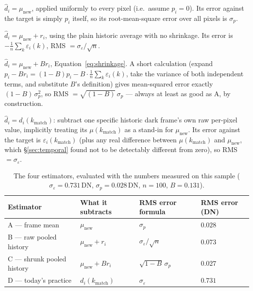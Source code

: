 \documentclass[11pt,a4paper]{article}
\begin{document}
\begin{description}[leftmargin=2.7cm,style=nextline]
\item[A --- frame mean only] $\hat d_i = \mu_{\mathrm{new}}$, applied
  uniformly to every pixel (i.e.\ assume $p_i = 0$). Its error against the
  target is simply $p_i$ itself, so its root-mean-square error over all
  pixels is $\sigma_p$.
\item[B --- raw pooled history] $\hat d_i = \mu_{\mathrm{new}} + r_i$,
  using the plain historic average with no shrinkage. Its error is
  $-\frac1n\sum_k\varepsilon_i(k)$, RMS $= \sigma_\varepsilon/\sqrt n$.
\item[C --- shrunk pooled history] $\hat d_i = \mu_{\mathrm{new}} + B r_i$,
  Equation~\ref{eq:shrinkage}. A short calculation (expand $p_i - B r_i =
  (1-B)p_i - B\cdot\frac1n\sum_k\varepsilon_i(k)$, take the variance of both
  independent terms, and substitute $B$'s definition) gives mean-squared
  error exactly $(1-B)\,\sigma_p^2$, so RMS $= \sqrt{(1-B)}\,\sigma_p$ ---
  always at least as good as A, by construction.
\item[D --- today's practice] $\hat d_i = d_i(k_{\mathrm{match}})$: subtract
  one specific historic dark frame's own raw per-pixel value, implicitly
  treating its $\mu(k_{\mathrm{match}})$ as a stand-in for
  $\mu_{\mathrm{new}}$. Its error against the target is
  $\varepsilon_i(k_{\mathrm{match}})$ (plus any real difference between
  $\mu(k_{\mathrm{match}})$ and $\mu_{\mathrm{new}}$, which
  \S\ref{sec:temporal} found not to be detectably different from zero), so
  RMS $= \sigma_\varepsilon$.
\end{description}

\begin{table}[H]
\centering
\caption{The four estimators, evaluated with the numbers measured on this
sample ($\sigma_\varepsilon = 0.731\,\mathrm{DN}$, $\sigma_p =
0.028\,\mathrm{DN}$, $n = 100$, $B = 0.131$).}
\label{tab:estimators}
\begin{tabular}{@{}llll@{}}
\toprule
Estimator & What it subtracts & RMS error formula & RMS error (DN) \\
\midrule
A --- frame mean & $\mu_{\mathrm{new}}$ & $\sigma_p$ & $0.028$ \\
B --- raw pooled history & $\mu_{\mathrm{new}} + r_i$ & $\sigma_\varepsilon/\sqrt n$ & $0.073$ \\
C --- shrunk pooled history & $\mu_{\mathrm{new}} + B r_i$ & $\sqrt{1-B}\,\sigma_p$ & $0.027$ \\
D --- today's practice & $d_i(k_{\mathrm{match}})$ & $\sigma_\varepsilon$ & $0.731$ \\
\bottomrule
\end{tabular}
\end{table}
\end{document}
